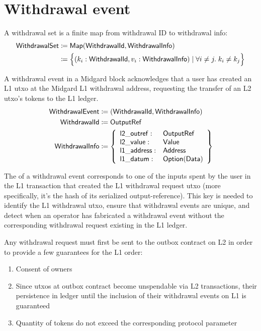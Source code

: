 \documentclass[../midgard.tex]{subfiles}
\begin{document}
\section{Withdrawal event}
\label{h:withdrawal-event}

A withdrawal set is a finite map from withdrawal ID to withdrawal info:
\begin{align*}
    \mathsf{WithdrawalSet} &\coloneq \mathsf{Map(WithdrawalId, WithdrawalInfo)} \\
      &\coloneq \Bigl\{
        (k_i: \mathsf{WithdrawalId}, v_i: \mathsf{WithdrawalInfo}) \mid \forall i \neq j.\; k_i \neq k_j
    \Bigr\}
\end{align*}

A withdrawal event in a Midgard block acknowledges that a user has created an L1 utxo at the Midgard L1 withdrawal address, requesting the transfer of an L2 utxo's tokens to the L1 ledger.
\begingroup
\allowdisplaybreaks{}
\begin{align*}
    \mathsf{WithdrawalEvent} &\coloneq \mathsf{(WithdrawalId, WithdrawalInfo)} \\
    \mathsf{WithdrawalId} &\coloneq \mathsf{OutputRef} \\
    \mathsf{WithdrawalInfo} &\coloneq \left\{
        \begin{array}{ll}
            \mathsf{l2\_outref} :& \mathsf{OutputRef} \\
            \mathsf{l2\_value} :& \mathsf{Value} \\
            \mathsf{l1\_address} : & \mathsf{Address} \\
            \mathsf{l1\_datum} : & \mathsf{Option(Data)}
        \end{array} \right\}
\end{align*}
\endgroup

The  of a withdrawal event corresponds to one of the inputs spent by the user in the L1 transaction that created the L1 withdrawal request utxo (more specifically, it's the hash of its serialized output-reference).
This key is needed to identify the L1 withdrawal utxo, ensure that withdrawal events are unique, and detect when an operator has fabricated a withdrawal event without the corresponding withdrawal request existing in the L1 ledger.

Any withdrawal request must first be sent to the outbox contract on L2 in order to provide a few guarantees for the L1 order:
\begin{enumerate}
  \item Consent of owners
  \item Since utxos at outbox contract become unspendable via L2 transactions, their persistence in ledger until the inclusion of their withdrawal events on L1 is guaranteed
  \item Quantity of tokens do not exceed the corresponding protocol parameter
\end{enumerate}
\end{document}
